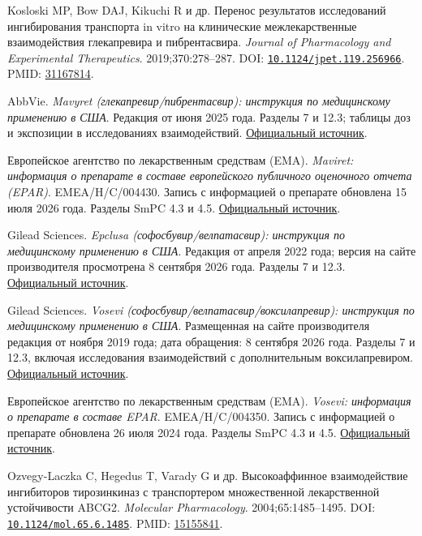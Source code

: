 \documentclass[11pt]{article}
\begin{document}
\begin{description}[before={\microtypesetup{expansion=false}\setlength{\RaggedRightRightskip}{0pt plus 4em}\RaggedRight}]
\item[{[13]}] Kosloski MP, Bow DAJ, Kikuchi R и др. Перенос результатов исследований ингибирования транспорта in vitro на клинические межлекарственные взаимодействия глекапревира и пибрентасвира. \textit{\foreignlanguage{english}{Journal of Pharmacology and Experimental Therapeutics}}. 2019;370:278--287. DOI: \href{https://doi.org/10.1124/jpet.119.256966}{\nolinkurl{10.1124/jpet.119.256966}}. PMID: \href{https://pubmed.ncbi.nlm.nih.gov/31167814/}{31167814}.
\item[{[14]}] AbbVie. \textit{Mavyret (глекапревир/пибрентасвир): инструкция по медицинскому применению в США}. Редакция от июня 2025 года. Разделы 7 и 12.3; таблицы доз и экспозиции в исследованиях взаимодействий. \href{https://www.rxabbvie.com/pdf/mavyret_pi.pdf}{Официальный источник}.
\item[{[15]}] Европейское агентство по лекарственным средствам (EMA). \textit{Maviret: информация о препарате в составе европейского публичного оценочного отчета (EPAR)}. EMEA/H/C/004430. Запись с информацией о препарате обновлена 15 июля 2026 года. Разделы SmPC 4.3 и 4.5. \href{https://www.ema.europa.eu/en/medicines/human/EPAR/maviret}{Официальный источник}.
\item[{[16]}] Gilead Sciences. \textit{Epclusa (софосбувир/велпатасвир): инструкция по медицинскому применению в США}. Редакция от апреля 2022 года; версия на сайте производителя просмотрена 8 сентября 2026 года. Разделы 7 и 12.3. \href{https://www.gilead.com/-/media/files/pdfs/medicines/liver-disease/epclusa/epclusa_pi.pdf}{Официальный источник}.
\item[{[17]}] Gilead Sciences. \textit{Vosevi (софосбувир/\allowbreak велпатасвир/\allowbreak воксилапревир): инструкция по медицинскому применению в США}. Размещенная на сайте производителя редакция от ноября 2019 года; дата обращения: 8 сентября 2026 года. Разделы 7 и 12.3, включая исследования взаимодействий с дополнительным воксилапревиром. \href{https://www.gilead.com/-/media/files/pdfs/medicines/liver-disease/vosevi/vosevi_pi.pdf}{Официальный источник}.
\item[{[18]}] Европейское агентство по лекарственным средствам (EMA). \textit{Vosevi: информация о препарате в составе EPAR}. EMEA/H/C/004350. Запись с информацией о препарате обновлена 26 июля 2024 года. Разделы SmPC 4.3 и 4.5. \href{https://www.ema.europa.eu/en/medicines/human/EPAR/vosevi}{Официальный источник}.
\item[{[19]}] Ozvegy-Laczka C, Hegedus T, Varady G и др. Высокоаффинное взаимодействие ингибиторов тирозинкиназ с транспортером множественной лекарственной устойчивости ABCG2. \textit{\foreignlanguage{english}{Molecular Pharmacology}}. 2004;65:1485--1495. DOI: \href{https://doi.org/10.1124/mol.65.6.1485}{\nolinkurl{10.1124/mol.65.6.1485}}. PMID: \href{https://pubmed.ncbi.nlm.nih.gov/15155841/}{15155841}.

\end{description}
\end{document}
